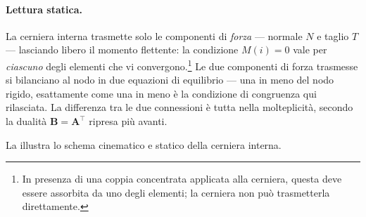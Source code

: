 \paragraph{Lettura statica.}
La cerniera interna trasmette solo le componenti
di \emph{forza} --- normale $N$ e taglio $T$ ---
lasciando libero il momento flettente: la condizione
$M(i) = 0$ vale per \emph{ciascuno} degli elementi
che vi convergono.\footnote{%
	In presenza di una coppia concentrata applicata alla
	cerniera, questa deve essere assorbita da uno degli
	elementi; la cerniera non può trasmetterla direttamente.}
Le due componenti di forza trasmesse si bilanciano al nodo in due
equazioni di equilibrio --- una in meno del nodo rigido, esattamente
come una in meno è la condizione di congruenza qui rilasciata. La
differenza tra le due connessioni è tutta nella molteplicità, secondo
la dualità $\bm{B}=\bm{A}^{\top}$ ripresa più avanti.


La  illustra
lo schema cinematico e statico della cerniera interna.

